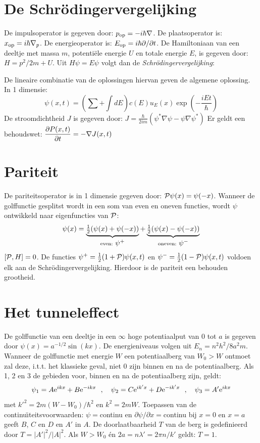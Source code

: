 \documentclass[twoside]{report}
\begin{document}
\section[~~De Schr\"odingervergelijking]{De Schr\"odingervergelijking}
De impulsoperator is gegeven door: $p_{\rm op}=-i\hbar\nabla$. De
plaatsoperator is: $x_{\rm op}=i\hbar\nabla_p$. De energieoperator is:
$E_{\rm op}=i\hbar\partial/\partial t$. De Hamiltoniaan van een deeltje met
massa $m$, potenti\"ele energie $U$ en totale energie $E$, is gegeven door:
$H=p^2/2m+U$. Uit $H\psi=E\psi$ volgt dan de {\it Schr\"odingervergelijking}:
\begin{center}
\end{center}
De lineaire combinatie van de oplossingen hiervan geven de algemene
oplossing. In 1 dimensie:
\[
\psi(x,t)=\left(\sum+\int dE\right)c(E)u_E(x)\exp\left(-\frac{iEt}{\hbar}\right)
\]
De stroomdichtheid $J$ is gegeven door:
$\displaystyle J=\frac{\hbar}{2im}(\psi^*\nabla\psi-\psi\nabla\psi^*)$
\npar
Er geldt een behoudswet: $\displaystyle\frac{\partial P(x,t)}{\partial t}=-\nabla J(x,t)$

\section[~~Pariteit]{Pariteit}
De pariteitsoperator is in 1 dimensie gegeven door: ${\cal P}\psi(x)=\psi(-x)$.
Wanneer de golffunctie gesplitst wordt in een som van even en oneven functies,
wordt $\psi$ ontwikkeld naar eigenfuncties van $\cal P$:
\[
\psi(x)=
\underbrace{\mbox{$\frac{1}{2}$}(\psi(x)+\psi(-x))}_{\rm even:~\hbox{$\psi^+$}}+
\underbrace{\mbox{$\frac{1}{2}$}(\psi(x)-\psi(-x))}_{\rm oneven:~\hbox{$\psi^-$}}
\]
$[{\cal P},H]=0$. De functies $\psi^+=\mbox{$\frac{1}{2}$}(1+{\cal P})\psi(x,t)$ en
$\psi^-=\mbox{$\frac{1}{2}$}(1-{\cal P})\psi(x,t)$ voldoen elk aan de\newline
Schr\"odingervergelijking. Hierdoor is de pariteit een behouden grootheid.

\section[~~Het tunneleffect]{Het tunneleffect}
De golffunctie van een deeltje in een $\infty$ hoge potentiaalput van 0 tot
$a$ is gegeven door $\psi(x)=a^{-1/2}\sin(kx)$. De energieniveaus volgen uit
$E_n=n^2h^2/8a^2m$.
\npar
Wanneer de golffunctie met energie $W$ een potentiaalberg van $W_0>W$
ontmoet zal deze, i.t.t. het klassieke geval, niet 0 zijn binnen en na de
potentiaalberg. Als 1, 2 en 3 de gebieden voor, binnen en na de potentiaalberg
zijn, geldt:
\[
\psi_1=A{\rm e}^{ikx}+B{\rm e}^{-ikx}~~,~~~
\psi_2=C{\rm e}^{ik'x}+D{\rm e}^{-ik'x}~~,~~~\psi_3=A'{\rm e}^{ikx}
\]
met $k'^2=2m(W-W_0)/\hbar^2$ en $k^2=2mW$. Toepassen van de
continu\"{\i}teitsvoorwaarden: $\psi=$continu en $\partial\psi/\partial x=$continu
bij $x=0$ en $x=a$ geeft $B$, $C$ en $D$ en $A'$ in $A$. De doorlaatbaarheid
$T$ van de berg is gedefinieerd door $T=|A'|^2/|A|^2$. Als $W>W_0$ \'en
$2a=n\lambda'=2\pi n/k'$ geldt: $T=1$.
\end{document}

